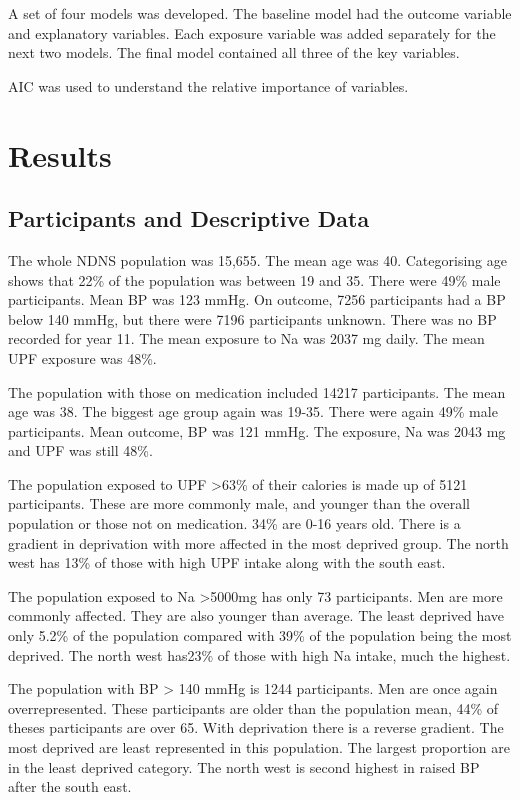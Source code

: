\documentclass[
]{article}
\begin{document}
A set of four models was developed. The baseline model had the outcome
variable and explanatory variables. Each exposure variable was added
separately for the next two models. The final model contained all three
of the key variables.

AIC was used to understand the relative importance of variables.

\newpage

\hypertarget{results}{%
\section{Results}\label{results}}

\hypertarget{participants-and-descriptive-data}{%
\subsection{Participants and Descriptive
Data}\label{participants-and-descriptive-data}}

The whole NDNS population was 15,655. The mean age was 40. Categorising
age shows that 22\% of the population was between 19 and 35. There were
49\% male participants. Mean BP was 123 mmHg. On outcome, 7256
participants had a BP below 140 mmHg, but there were 7196 participants
unknown. There was no BP recorded for year 11. The mean exposure to Na
was 2037 mg daily. The mean UPF exposure was 48\%.

The population with those on medication included 14217 participants. The
mean age was 38. The biggest age group again was 19-35. There were again
49\% male participants. Mean outcome, BP was 121 mmHg. The exposure, Na
was 2043 mg and UPF was still 48\%.

The population exposed to UPF \textgreater63\% of their calories is made
up of 5121 participants. These are more commonly male, and younger than
the overall population or those not on medication. 34\% are 0-16 years
old. There is a gradient in deprivation with more affected in the most
deprived group. The north west has 13\% of those with high UPF intake
along with the south east.

The population exposed to Na \textgreater5000mg has only 73
participants. Men are more commonly affected. They are also younger than
average. The least deprived have only 5.2\% of the population compared
with 39\% of the population being the most deprived. The north west
has23\% of those with high Na intake, much the highest.

The population with BP \textgreater{} 140 mmHg is 1244 participants. Men
are once again overrepresented. These participants are older than the
population mean, 44\% of theses participants are over 65. With
deprivation there is a reverse gradient. The most deprived are least
represented in this population. The largest proportion are in the least
deprived category. The north west is second highest in raised BP after
the south east.
\end{document}
